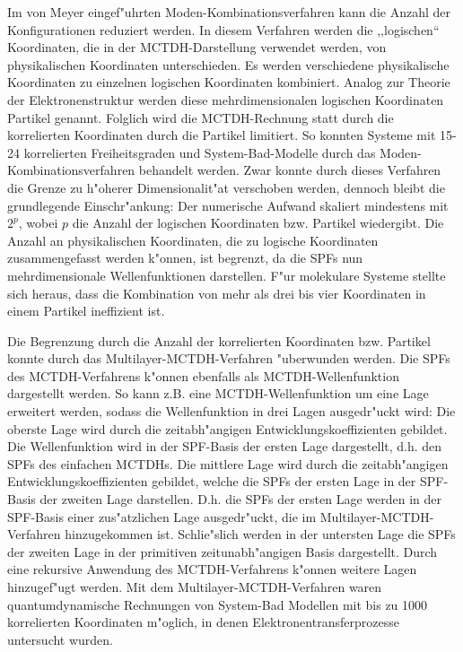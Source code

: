  Im von Meyer eingef"uhrten Moden-Kombinationsverfahren kann die Anzahl der Konfigurationen reduziert werden.
In diesem Verfah\-ren werden die ,,logischen`` Koordina\-ten, die in der MCTDH-Darstellung verwendet werden, von physikalischen Koordinaten unterschieden. 
Es werden verschiedene physikalische Koordinaten zu einzelnen logi\-schen Koordinaten kombiniert.
Analog zur Theorie der Elektronenstruktur werden diese mehrdimensionalen logischen Koordinaten Partikel genannt. 
Folglich wird die MCTDH-Rechnung statt durch die korrelierten Koordinaten durch die Partikel limitiert. 
So konnten Systeme  mit 15-24 korrelierten Freiheitsgraden \cite{H5O2+MCTDH2, H5O2+MCTDH3, RWMC, CWMC}
und System-Bad-Mo\-del\-le \cite{W, WTM, NM2} durch das Moden-Kombinationsverfahren behandelt werden.
Zwar konnte durch dieses Verfahren die Grenze zu h"oherer Dimensionalit"at verschoben werden,
 dennoch bleibt die grundlegende Einschr"ankung: Der numerische Aufwand skaliert mindestens mit $2^p$, wobei $ p $ die Anzahl der logischen Koordinaten bzw.
 Partikel wiedergibt. Die Anzahl an physikalischen Koordinaten, die zu logische Koordinaten zusammengefasst werden k"onnen, ist begrenzt, da die SPFs
 nun mehrdimensionale Wellenfunktionen darstellen. F"ur molekulare Systeme stellte sich heraus, dass die Kombination von mehr als drei bis vier Koordinaten in einem Partikel
ineffizient ist.

Die Begrenzung durch die Anzahl der korrelierten Koordinaten bzw. Partikel konnte durch das Multilayer-MCTDH-Verfahren \cite{WT3} "uberwunden werden.
Die SPFs des MCTDH-Verfahrens k"onnen ebenfalls als MCTDH-Wellenfunktion dargestellt werden.
So kann z.B. eine MCTDH-Wellenfunktion um eine Lage erweitert werden, sodass die Wellenfunktion in drei Lagen ausgedr"uckt wird:
Die oberste Lage wird durch die zeitabh"angigen Entwicklungskoeffizienten gebildet. Die Wellenfunktion wird in der SPF-Basis der ersten Lage dargestellt, d.h.
den SPFs des einfachen MCTDHs. Die mittlere Lage wird durch die zeitabh"angigen Entwicklungskoeffizienten gebildet, welche die SPFs der ersten Lage in der
SPF-Basis der zweiten Lage darstellen.
D.h. die SPFs der ersten Lage werden in der SPF-Basis einer zus"atzlichen Lage ausgedr"uckt, die im Multilayer-MCTDH-Verfahren hinzugekommen ist. 
Schlie"slich werden in der untersten Lage die SPFs der zweiten Lage in der primitiven zeitunabh"angigen Basis dargestellt.
Durch eine rekursive Anwendung des MCTDH-Verfahrens k"onnen weitere Lagen hinzugef"ugt werden.
Mit dem Multilayer-MCTDH-Verfahren waren quantumdynamische Rechnungen von System-Bad Modellen mit bis zu 1000 korrelierten Koordinaten m"oglich,
in denen Elektronentransferprozesse \cite{WT3, WST} untersucht wurden.

